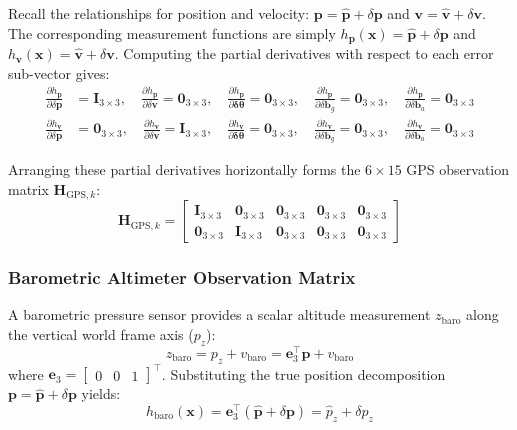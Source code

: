 \documentclass{article}
\begin{document}
	Recall the relationships for position and velocity: $\mathbf{p} = \hat{\mathbf{p}} + \delta\mathbf{p}$ and $\mathbf{v} = \hat{\mathbf{v}} + \delta\mathbf{v}$. The corresponding measurement functions are simply $h_{\mathbf{p}}(\mathbf{x}) = \hat{\mathbf{p}} + \delta\mathbf{p}$ and $h_{\mathbf{v}}(\mathbf{x}) = \hat{\mathbf{v}} + \delta\mathbf{v}$. Computing the partial derivatives with respect to each error sub-vector gives:
	\begin{align*}
		\frac{\partial h_{\mathbf{p}}}{\partial \delta\mathbf{p}} &= \mathbf{I}_{3 \times 3}, \quad \frac{\partial h_{\mathbf{p}}}{\partial \delta\mathbf{v}} = \mathbf{0}_{3 \times 3}, \quad \frac{\partial h_{\mathbf{p}}}{\partial \bm{\delta\theta}} = \mathbf{0}_{3 \times 3}, \quad \frac{\partial h_{\mathbf{p}}}{\partial \delta\mathbf{b}_g} = \mathbf{0}_{3 \times 3}, \quad \frac{\partial h_{\mathbf{p}}}{\partial \delta\mathbf{b}_a} = \mathbf{0}_{3 \times 3} \\
		\frac{\partial h_{\mathbf{v}}}{\partial \delta\mathbf{p}} &= \mathbf{0}_{3 \times 3}, \quad \frac{\partial h_{\mathbf{v}}}{\partial \delta\mathbf{v}} = \mathbf{I}_{3 \times 3}, \quad \frac{\partial h_{\mathbf{v}}}{\partial \bm{\delta\theta}} = \mathbf{0}_{3 \times 3}, \quad \frac{\partial h_{\mathbf{v}}}{\partial \delta\mathbf{b}_g} = \mathbf{0}_{3 \times 3}, \quad \frac{\partial h_{\mathbf{v}}}{\partial \delta\mathbf{b}_a} = \mathbf{0}_{3 \times 3}
	\end{align*}
	
	Arranging these partial derivatives horizontally forms the $6 \times 15$ GPS observation matrix $\mathbf{H}_{\text{GPS}, k}$:
	\begin{equation*}
		\mathbf{H}_{\text{GPS}, k} = 
		\begin{bmatrix}
			\mathbf{I}_{3 \times 3} & \mathbf{0}_{3 \times 3} & \mathbf{0}_{3 \times 3} & \mathbf{0}_{3 \times 3} & \mathbf{0}_{3 \times 3} \\
			\mathbf{0}_{3 \times 3} & \mathbf{I}_{3 \times 3} & \mathbf{0}_{3 \times 3} & \mathbf{0}_{3 \times 3} & \mathbf{0}_{3 \times 3}
		\end{bmatrix}
	\end{equation*}
	
	\subsubsection{Barometric Altimeter Observation Matrix}
	A barometric pressure sensor provides a scalar altitude measurement $z_{\text{baro}}$ along the vertical world frame axis ($p_z$):
	\begin{equation*}
		z_{\text{baro}} = p_z + v_{\text{baro}} = \mathbf{e}_3^\top \mathbf{p} + v_{\text{baro}}
	\end{equation*}
	where $\mathbf{e}_3 = \begin{bmatrix} 0 & 0 & 1 \end{bmatrix}^\top$. Substituting the true position decomposition $\mathbf{p} = \hat{\mathbf{p}} + \delta\mathbf{p}$ yields:
	\begin{equation*}
		h_{\text{baro}}(\mathbf{x}) = \mathbf{e}_3^\top (\hat{\mathbf{p}} + \delta\mathbf{p}) = \hat{p}_z + \delta p_z
	\end{equation*}
	
\end{document}
